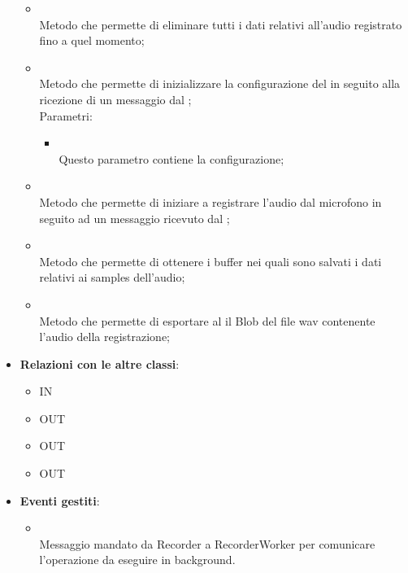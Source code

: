 \begin{itemize}
\begin{itemize}
		\item[]  \\
		Metodo che permette di eliminare tutti i dati relativi all'audio registrato fino a quel momento;\\
		\item[]  \\
		Metodo che permette di inizializzare la configurazione del  in seguito alla ricezione di un messaggio dal ;\\
		Parametri:
		\begin{itemize}
			\item {} \\
			Questo parametro contiene la configurazione;
		\end{itemize}
		\item[]  \\
		Metodo che permette di iniziare a registrare l'audio dal microfono in seguito ad un messaggio ricevuto dal ;\\
		\item[]  \\
		Metodo che permette di ottenere i buffer nei quali sono salvati i dati relativi ai samples dell'audio;\\
		\item[]  \\
		Metodo che permette di esportare al  il Blob del file wav contenente l'audio della registrazione;\\
	\end{itemize}
	\item \textbf{Relazioni con le altre classi}:
	\begin{itemize}
		\item IN \hyperlink{Recorder_label}{}
		\item OUT \hyperlink{RecorderWorkerConfig_label}{}
		\item OUT \hyperlink{RecorderWorkerMsg_label}{}
		\item OUT \hyperlink{RecorderMsg_label}{}
	\end{itemize}
	\item \textbf{Eventi gestiti}:
	\begin{itemize}
\item {} \\ Messaggio mandato da Recorder a RecorderWorker per comunicare l'operazione da eseguire in background.	\end{itemize}
\end{itemize}
\FloatBarrier

